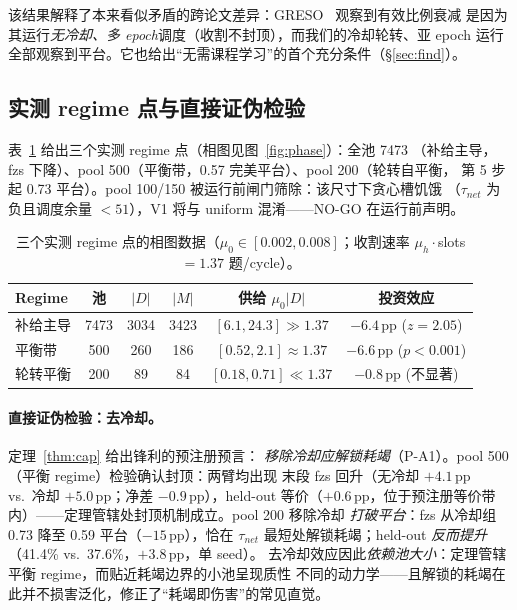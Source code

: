 \documentclass[11pt]{article}
\theoremstyle{definition}
\begin{document}
该结果解释了本来看似矛盾的跨论文差异：GRESO~\citep{zheng2025greso} 观察到有效比例衰减
是因为其运行\emph{无冷却、多 epoch}调度（收割不封顶），而我们的冷却轮转、亚 epoch
运行全部观察到平台。它也给出“无需课程学习”的首个充分条件（\S\ref{sec:find}）。

\subsection{实测 regime 点与直接证伪检验}\label{sec:l3-regime}
表~\ref{tab:phase} 给出三个实测 regime 点（相图见图~\ref{fig:phase}）：全池 7473
（补给主导，fzs 下降）、pool 500（平衡带，0.57 完美平台）、pool 200（轮转自平衡，
第 5 步起 0.73 平台）。pool 100/150 被运行前闸门筛除：该尺寸下贪心槽饥饿
（$\tau_{net}$ 为负且调度余量 $<51$），V1 将与 uniform 混淆——NO-GO 在运行前声明。

\begin{table}[t]
\centering\small
\caption{三个实测 regime 点的相图数据（$\mu_0\in[0.002,0.008]$；收割速率
$\mu_h\cdot$slots $=1.37$ 题/cycle）。}
\label{tab:phase}
\begin{tabular}{@{}lccccc@{}}
\toprule
Regime & 池 & $|D|$ & $|M|$ & 供给 $\mu_0|D|$ & 投资效应 \\
\midrule
补给主导 & 7473 & 3034 & 3423 & $[6.1,24.3]\gg1.37$ & $-6.4$\,pp ($z{=}2.05$) \\
平衡带 & 500 & 260 & 186 & $[0.52,2.1]\approx1.37$ & $-6.6$\,pp ($p{<}0.001$) \\
轮转平衡 & 200 & 89 & 84 & $[0.18,0.71]\ll1.37$ & $-0.8$\,pp (不显著) \\
\bottomrule
\end{tabular}
\end{table}

\paragraph{直接证伪检验：去冷却。}定理~\ref{thm:cap} 给出锋利的预注册预言：
\emph{移除冷却应解锁耗竭}（P-A1）。pool 500（平衡 regime）检验确认封顶：两臂均出现
末段 fzs 回升（无冷却 $+4.1$\,pp vs.\ 冷却 $+5.0$\,pp；净差 $-0.9$\,pp），held-out
等价（$+0.6$\,pp，位于预注册等价带内）——定理管辖处封顶机制成立。pool 200 移除冷却
\emph{打破平台}：fzs 从冷却组 0.73 降至 0.59 平台（$-15$\,pp），恰在 $\tau_{net}$
最短处解锁耗竭；held-out \emph{反而提升}（41.4\% vs.\ 37.6\%，$+3.8$\,pp，单 seed）。
去冷却效应因此\emph{依赖池大小}：定理管辖平衡 regime，而贴近耗竭边界的小池呈现质性
不同的动力学——且解锁的耗竭在此并不损害泛化，修正了“耗竭即伤害”的常见直觉。
\end{document}
